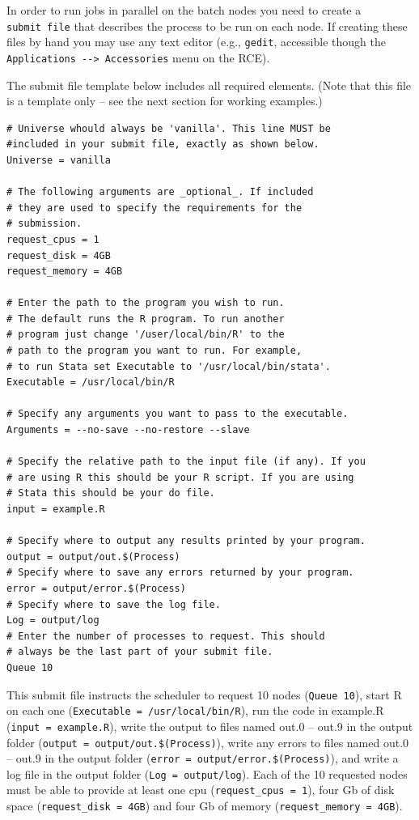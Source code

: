 \documentclass[
]{book}
\begin{document}
In order to run jobs in parallel on the batch nodes you need to create a
\texttt{submit\ file} that describes the process to be run on each node. If
creating these files by hand you may use any text editor (e.g., \texttt{gedit},
accessible though the \texttt{Applications\ -\/-\textgreater{}\ Accessories} menu on the RCE).

The submit file template below includes all required elements. (Note
that this file is a template only -- see the next section for working
examples.)

\begin{verbatim}
# Universe whould always be 'vanilla'. This line MUST be
#included in your submit file, exactly as shown below.
Universe = vanilla

# The following arguments are _optional_. If included
# they are used to specify the requirements for the
# submission.
request_cpus = 1
request_disk = 4GB
request_memory = 4GB

# Enter the path to the program you wish to run.
# The default runs the R program. To run another
# program just change '/user/local/bin/R' to the
# path to the program you want to run. For example,
# to run Stata set Executable to '/usr/local/bin/stata'.
Executable = /usr/local/bin/R

# Specify any arguments you want to pass to the executable.
Arguments = --no-save --no-restore --slave

# Specify the relative path to the input file (if any). If you
# are using R this should be your R script. If you are using
# Stata this should be your do file.
input = example.R

# Specify where to output any results printed by your program.
output = output/out.$(Process)
# Specify where to save any errors returned by your program.
error = output/error.$(Process)
# Specify where to save the log file.
Log = output/log
# Enter the number of processes to request. This should
# always be the last part of your submit file.
Queue 10
\end{verbatim}

This submit file instructs the scheduler to request 10 nodes
(\texttt{Queue\ 10}), start R on each one (\texttt{Executable\ =\ /usr/local/bin/R}),
run the code in example.R (\texttt{input\ =\ example.R}), write the output to
files named out.0 -- out.9 in the output folder
(\texttt{output\ =\ output/out.\$(Process)}), write any errors to files named
out.0 -- out.9 in the output folder (\texttt{error\ =\ output/error.\$(Process)}),
and write a log file in the output folder (\texttt{Log\ =\ output/log}). Each of
the 10 requested nodes must be able to provide at least one cpu
(\texttt{request\_cpus\ =\ 1}), four Gb of disk space (\texttt{request\_disk\ =\ 4GB}) and
four Gb of memory (\texttt{request\_memory\ =\ 4GB}).
\end{document}
